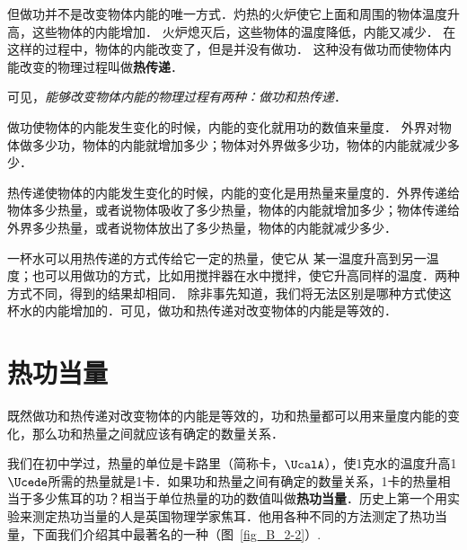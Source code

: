 但做功并不是改变物体内能的唯一方式．灼热的火炉使它上面和周围的物体温度升高，这些物体的内能增加．
火炉熄灭后，这些物体的温度降低，内能又减少．
在这样的过程中，物体的内能改变了，但是并没有做功．
这种没有做功而使物体内能改变的物理过程叫做\textbf{热传递}．

可见，\textit{能够改变物体内能的物理过程有两种：做功和热传递}．

做功使物体的内能发生变化的时候，内能的变化就用功的数值来量度．
外界对物体做多少功，物体的内能就增加多少；物体对外界做多少功，物体的内能就减少多少．

热传递使物体的内能发生变化的时候，内能的变化是用热量来量度的．外界传递给物体多少热量，或者说物体吸收了多少热量，物体的内能就增加多少；物体传递给外界多少热量，或者说物体放出了多少热量，物体的内能就减少多少．

一杯水可以用热传递的方式传给它一定的热量，使它从
某一温度升高到另一温度；也可以用做功的方式，比如用搅拌器在水中搅拌，使它升高同样的温度．两种方式不同，得到的结果却相同．
除非事先知道，我们将无法区别是哪种方式使这杯水的内能增加的．可见，做功和热传递对改变物体的内能是等效的．

\section{热功当量}
既然做功和热传递对改变物体的内能是等效的，功和热量都可以用来量度内能的变化，那么功和热量之间就应该有确定的数量关系．

我们在初中学过，热量的单位是卡路里（简称卡，$\UcalA$），使1克水的温度升高1$\Ucede$所需的热量就是1卡．如果功和热量之间有确定的数量关系，1卡的热量相当于多少焦耳的功？相当于单位热量的功的数值叫做\textbf{热功当量}．历史上第一个用实验来测定热功当量的人是英国物理学家焦耳．他用各种不同的方法测定了热功当量，下面我们介绍其中最著名的一种（图~\ref{fig_B_2-2}）.

